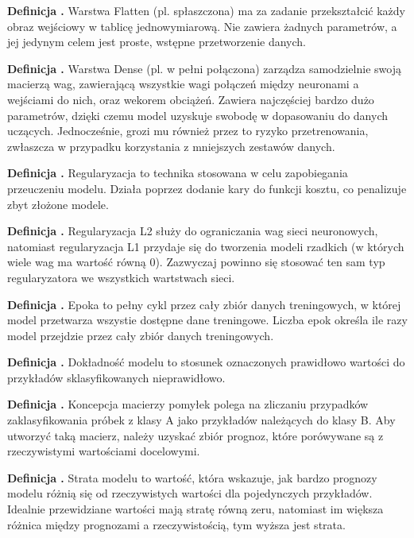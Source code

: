 \noindent
\textbf{Definicja \mlDefinitionIndex.}
\incrementMlDefinitionIndex
Warstwa Flatten (pl. spłaszczona) ma za zadanie przekształcić każdy obraz wejściowy w tablicę jednowymiarową.
Nie zawiera żadnych parametrów, a jej jedynym celem jest proste, wstępne przetworzenie danych.

\noindent
\textbf{Definicja \mlDefinitionIndex.}
\incrementMlDefinitionIndex
Warstwa Dense (pl. w pełni połączona) zarządza samodzielnie swoją macierzą wag,
zawierającą wszystkie wagi połączeń między neuronami a wejściami do nich, oraz wekorem obciążeń.
Zawiera najczęściej bardzo dużo parametrów, dzięki czemu model uzyskuje swobodę w dopasowaniu do danych uczących.
Jednocześnie, grozi mu również przez to ryzyko przetrenowania,
zwłaszcza w przypadku korzystania z mniejszych zestawów danych.

\noindent
\textbf{Definicja \mlDefinitionIndex.}
\incrementMlDefinitionIndex
Regularyzacja to technika stosowana w celu zapobiegania przeuczeniu modelu.
Działa poprzez dodanie kary do funkcji kosztu, co penalizuje zbyt złożone modele.

\noindent
\textbf{Definicja \mlDefinitionIndex.}
\incrementMlDefinitionIndex
Regularyzacja L2 służy do ograniczania wag sieci neuronowych,
natomiast regularyzacja L1 przydaje się do tworzenia modeli rzadkich (w których wiele wag ma wartość równą 0). 
Zazwyczaj powinno się stosować ten sam typ regularyzatora we wszystkich wartstwach sieci.

\noindent
\textbf{Definicja \mlDefinitionIndex.}
\incrementMlDefinitionIndex
Epoka to pełny cykl przez cały zbiór danych treningowych, w której model przetwarza wszystie dostępne dane treningowe.
Liczba epok określa ile razy model przejdzie przez cały zbiór danych treningowych.

\noindent
\textbf{Definicja \mlDefinitionIndex.}
\incrementMlDefinitionIndex
Dokładność modelu to stosunek oznaczonych prawidłowo wartości do przykładów sklasyfikowanych nieprawidłowo.

\noindent
\textbf{Definicja \mlDefinitionIndex.}
\incrementMlDefinitionIndex
Koncepcja macierzy pomyłek polega na zliczaniu przypadków zaklasyfikowania próbek z klasy A jako przykładów należących do klasy B.
Aby utworzyć taką macierz, należy uzyskać zbiór prognoz, które porówywane są z rzeczywistymi wartościami docelowymi.

\noindent
\textbf{Definicja \mlDefinitionIndex.}
\incrementMlDefinitionIndex
Strata modelu to wartość, która wskazuje,
jak bardzo prognozy modelu różnią się od rzeczywistych wartości dla pojedynczych przykładów.
Idealnie przewidziane wartości mają stratę równą zeru,
natomiast im większa różnica między prognozami a rzeczywistością, tym wyższa jest strata.


